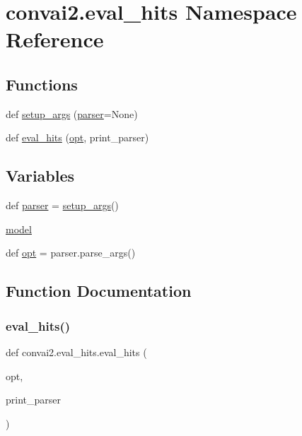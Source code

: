 \hypertarget{namespaceconvai2_1_1eval__hits}{}\section{convai2.\+eval\+\_\+hits Namespace Reference}
\label{namespaceconvai2_1_1eval__hits}
\subsection*{Functions}
\begin{DoxyCompactItemize}
\item 
def \hyperlink{namespaceconvai2_1_1eval__hits_a3c68be2e1a546ad88843f387bf865deb}{setup\+\_\+args} (\hyperlink{namespaceconvai2_1_1eval__hits_a4efddcdcd89a045f5533c6da390fd86b}{parser}=None)
\item 
def \hyperlink{namespaceconvai2_1_1eval__hits_aaa86a5d78cf7702ea137d06afbcf9896}{eval\+\_\+hits} (\hyperlink{namespaceconvai2_1_1eval__hits_a97e612a68f87f99ba3bba783314069f7}{opt}, print\+\_\+parser)
\end{DoxyCompactItemize}
\subsection*{Variables}
\begin{DoxyCompactItemize}
\item 
def \hyperlink{namespaceconvai2_1_1eval__hits_a4efddcdcd89a045f5533c6da390fd86b}{parser} = \hyperlink{namespaceconvai2_1_1eval__hits_a3c68be2e1a546ad88843f387bf865deb}{setup\+\_\+args}()
\item 
\hyperlink{namespaceconvai2_1_1eval__hits_a82a50b514da37d7bcb6216e90b61561e}{model}
\item 
def \hyperlink{namespaceconvai2_1_1eval__hits_a97e612a68f87f99ba3bba783314069f7}{opt} = parser.\+parse\+\_\+args()
\end{DoxyCompactItemize}


\subsection{Function Documentation}
\mbox{\label{namespaceconvai2_1_1eval__hits_aaa86a5d78cf7702ea137d06afbcf9896}} 
\subsubsection{\texorpdfstring{eval\+\_\+hits()}{eval\_hits()}}
{\footnotesize\ttfamily def convai2.\+eval\+\_\+hits.\+eval\+\_\+hits (\begin{DoxyParamCaption}\item[{}]{opt,  }\item[{}]{print\+\_\+parser }\end{DoxyParamCaption})}



